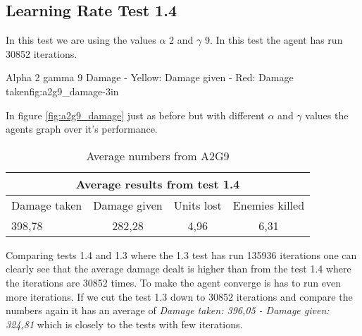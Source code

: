 \subsection*{Learning Rate Test 1.4}
In this test we are using the values $\alpha$ 2 and $\gamma$ 9. In this test the agent has run 30852 iterations.


			{Alpha 2 gamma 9 Damage - Yellow: Damage given - Red: Damage taken}{fig:a2g9_damage}{-3in}

In figure \ref{fig:a2g9_damage} just as before but with different $\alpha$ and $\gamma$ values the agents graph over it's performance.




\begin{centering}
\begin{table}
 \begin{tabular}{|l|c|c|c|}
	\multicolumn{4}{c}{Average results from test 1.4} \\
	\hline
		Damage taken & Damage given & Units lost & Enemies killed\\
	\hline
		398,78 & 282,28 & 4,96 & 6,31 \\
		\hline
\end{tabular}

\label{test1.4}
\caption{Average numbers from A2G9}
\end{table}
\end{centering}


Comparing tests 1.4 and 1.3 where the 1.3 test has run 135936 iterations one can clearly see that the average damage dealt is higher than from the test 1.4 where the iterations are 30852 times. To make the agent converge is has to run even more iterations. If we cut the test 1.3 down to 30852 iterations and compare the numbers again it has an average of \textit{Damage taken: 396,05 - Damage given: 324,81} which is closely to the tests with few iterations.
